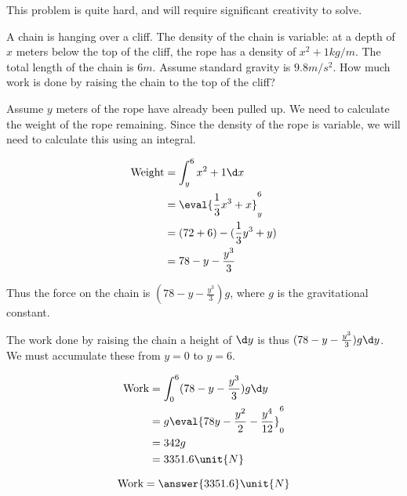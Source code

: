 \documentclass{ximera}
\author{Steven Gubkin}
\begin{document}
\begin{exercise}


\begin{warning}
This problem is quite hard, and will require significant creativity to solve.
\end{warning}

A chain is hanging over a cliff.  The density of the chain is variable:  at a depth of $x$ meters below the top of the cliff, the rope has a density of $x^2+1 \unit{kg}/\unit{m}$.  The total length of the chain is $6 \unit{m}$. Assume standard gravity is $9.8 \unit{m}/\unit{s}^2 $. How much work is done by raising the chain to the top of the cliff?

\begin{hint}
	Assume $y$ meters of the rope have already been pulled up.  We need to calculate the weight of the rope remaining.  Since the density of the rope is variable, we will need to calculate this using an integral.
	
	\begin{align*}
		\textrm{Weight} &= \int_y^6 x^2+1 \d x\\
			&= \eval{\frac{1}{3}x^3+x}_y^6\\
			&= (72+6)-(\frac{1}{3}y^3+y)\\
			&=78-y-\frac{y^3}{3}
	\end{align*} 
\end{hint}

\begin{hint}
	Thus the force on the chain is $(78-y-\frac{y^3}{3})g$, where $g$ is the gravitational constant.
\end{hint}

\begin{hint}
	The work done by raising the chain a height of $\d y$ is thus $(78-y-\frac{y^3}{3})g \d y$.  We must accumulate these from $y=0$ to $y=6$.
	
	\begin{align*}
	\textrm{Work} &= \int_0^6 (78-y-\frac{y^3}{3})g \d y\\	
			&=g\eval{78y - \frac{y^2}{2} - \frac{y^4}{12}}_0^6\\
			&= 342g\\
			&=3351.6 \unit{N}
	\end{align*}
\end{hint}

\begin{prompt}
	\[
	\textrm{Work} = \answer{3351.6} \unit{N}
	\]
\end{prompt}

\end{exercise}
\end{document}
